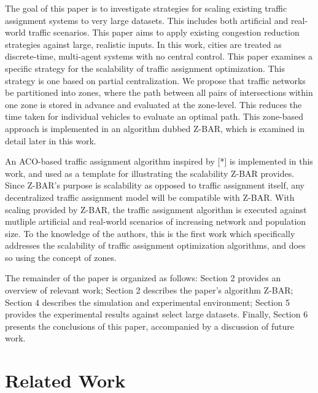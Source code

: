 \documentclass[conference]{IEEEtran}
\begin{document}
The goal of this paper is to investigate strategies for scaling existing traffic assignment systems to very large datasets. This includes both artificial and real-world traffic scenarios. This paper aims to apply existing congestion reduction strategies against large, realistic inputs. In this work, cities are treated as discrete-time, multi-agent systems with no central control. This paper examines a specific strategy for the scalability of traffic assignment optimization. This strategy is one based on partial centralization. We propose that traffic networks be partitioned into zones, where the path between all pairs of intersections within one zone is stored in advance and evaluated at the zone-level. This reduces the time taken for individual vehicles to evaluate an optimal path. This zone-based approach is implemented in an algorithm dubbed Z-BAR, which is examined in detail later in this work.

An ACO-based traffic assignment algorithm inspired by [*] is implemented in this work, and used as a template for illustrating the scalability Z-BAR provides. Since Z-BAR's purpose is scalability as opposed to traffic assignment itself, any decentralized traffic assignment model will be compatible with Z-BAR. With scaling provided by Z-BAR, the traffic assignment algorithm is executed against mutliple artificial and real-world scenarios of increasing network and population size. To the knowledge of the authors, this is the first work which specifically addresses the scalability of traffic assignment optimization algorithms, and does so using the concept of zones.

The remainder of the paper is organized as follows: Section 2 provides an overview of relevant work; Section 2 describes the paper's algorithm Z-BAR; Section 4 describes the simulation and experimental environment; Section 5 provides the experimental results against select large datasets. Finally, Section 6 presents the conclusions of this paper, accompanied by a discussion of future work.


\section{Related Work} %
\end{document}
